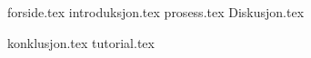 \documentclass[12pt,twoside,openany, final ]{report}
\begin{document}
{forside.tex}
\setcounter{page}{0}
\listoftodos %
\tableofcontents
\setcounter{page}{0}
{introduksjon.tex}
{prosess.tex}
{Diskusjon.tex}


{konklusjon.tex}
\appendix
{tutorial.tex}

\printbibliography
\end{document}

